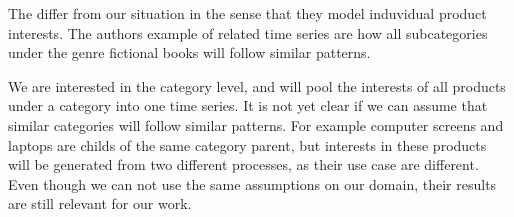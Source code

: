The \cite{Bandara2019} differ from our situation in the sense that they model
induvidual product interests. The authors example of related time series are how
all subcategories under the genre fictional books will follow similar patterns.

We are interested in the category level, and will pool the interests of all products under
a category into one time series. It is not yet clear if we can assume that similar categories 
will follow similar patterns. 
For example computer screens and laptops are childs of the same category parent, 
but interests in these products will be generated from two different processes, as their 
use case are different.
Even though we can not use the same assumptions on our domain, their results are still relevant
for our work.